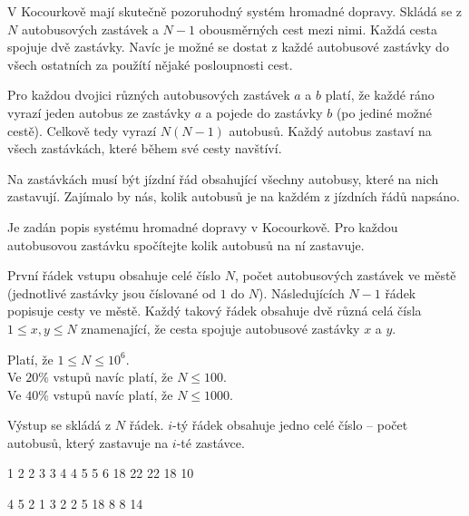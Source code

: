 





V Kocourkově mají skutečně pozoruhodný systém hromadné dopravy.
Skládá se z $N$ autobusových zastávek a $N-1$ obousměrných cest mezi nimi. Každá cesta spojuje dvě zastávky.
Navíc je možné se dostat z každé autobusové zastávky do všech ostatních za použítí nějaké posloupnosti cest.

Pro každou dvojici různých autobusových zastávek $a$ a $b$ platí, že každé ráno
vyrazí jeden autobus ze zastávky $a$ a pojede do zastávky $b$ (po jediné možné cestě).
Celkově tedy vyrazí $N(N-1)$ autobusů.
Každý autobus zastaví na všech zastávkách, které během své cesty navštíví.

Na zastávkách musí být jízdní řád obsahující všechny autobusy, které na nich zastavují.
Zajímalo by nás, kolik autobusů je na každém z jízdních řádů napsáno.


Je zadán popis systému hromadné dopravy v Kocourkově.
Pro každou autobusovou zastávku spočítejte kolik autobusů na ní zastavuje.


První řádek vstupu obsahuje celé číslo $N$, počet autobusových zastávek ve městě (jednotlivé zastávky jsou číslované od $1$ do $N$).
Následujících $N-1$ řádek popisuje cesty ve městě.
Každý takový řádek obsahuje dvě různá celá čísla $1 \le x, y \le N$ znamenající, že cesta spojuje autobusové zastávky $x$ a $y$.

\bigskip
\noindent
Platí, že $1 \leq N \leq 10^6$.\\
Ve $20\%$ vstupů navíc platí, že $N \leq 100$.\\
Ve $40\%$ vstupů navíc platí, že $N \leq 1000$.


Výstup se skládá z $N$ řádek. $i$-tý řádek obsahuje jedno celé číslo -- počet autobusů, který zastavuje na $i$-té zastávce.


1 2
2 3
3 4
4 5
5 6
18
22
22
18
10
\sampleEND

\bigskip

4 5
2 1
3 2
2 5
18
8
8
14
\sampleEND


